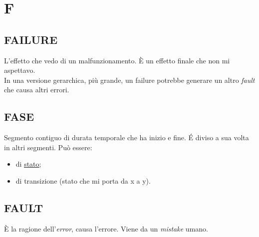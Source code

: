 \newpage
	\section{F} \label{sec:F}
	
		\subsection{FAILURE}		\label{failure}	%
		L'effetto che vedo di un malfunzionamento. È un effetto finale che non mi aspettavo. \\
		In una versione gerarchica, più grande, un failure potrebbe generare un altro \textit{fault} che causa altri errori. %
	
		\subsection{FASE}  \label{fase}  
		Segmento contiguo di durata temporale che ha inizio e fine. É diviso a sua volta in altri segmenti. Può essere:
		\begin{itemize}
			\item di \underline{\hyperref[stato]{stato}};
			\item di transizione (stato che mi porta da x a y).
		\end{itemize}
	
		\subsection{FAULT}		\label{fault}
		È la ragione dell'\textit{error}, causa l'errore. Viene da un \textit{mistake} umano.
		
	
	
